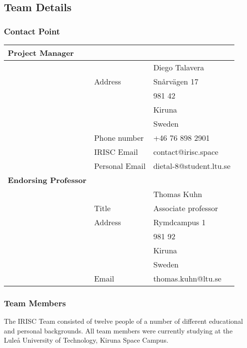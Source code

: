 \subsection{Team Details}
\subsubsection{Contact Point}


\begin{tabular}{m{} m{} m{}}
	\textbf{Project Manager} & & \\	\hline
	 & & Diego Talavera \\
	 & Address & Snårvägen 17 \\
	 & & 981 42 \\
	 & & Kiruna \\
	 & & Sweden \\
	 & Phone number & +46 76 898 2901\\
 	 & IRISC Email & contact@irisc.space \\
	 & Personal Email & dietal-8@student.ltu.se\\
	 \textbf{Endorsing Professor} & & \\ \hline
	 & & Thomas Kuhn \\
	 & Title & Associate professor \\
	 & Address & Rymdcampus 1 \\
	 & &  981 92 \\
	 & & Kiruna \\
	 & & Sweden \\
	 & Email & thomas.kuhn@ltu.se \\

\end{tabular}

\subsubsection{Team Members}
The IRISC Team consisted of twelve people of a number of different educational and personal backgrounds. All team members were currently studying at the Lule{\aa} University of Technology, Kiruna Space Campus.

\bigskip

